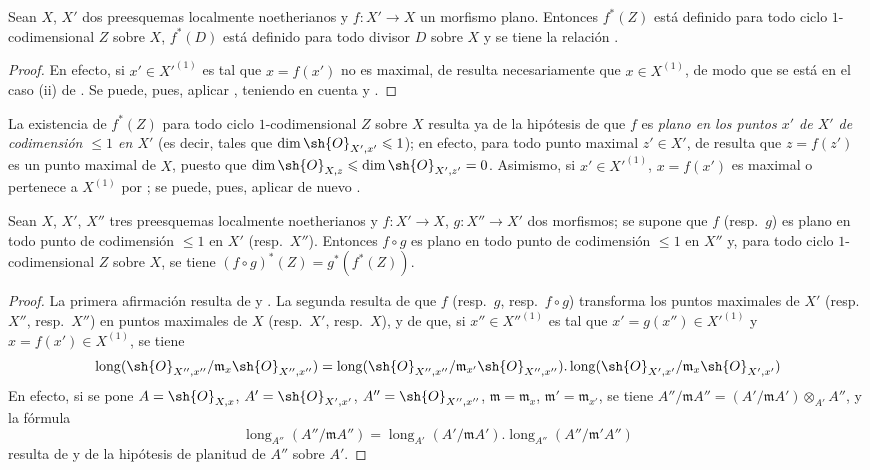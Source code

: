 \begin{proposition}[21.10.6]
\label{IV.21.10.6}
Sean $X$, $X'$ dos preesquemas localmente noetherianos y $f:X'\to X$ un morfismo plano.
Entonces $f^*(Z)$ está definido para todo ciclo $1$-codimensional $Z$ sobre $X$, $f^*(D)$ está definido para todo divisor $D$ sobre $X$ y se tiene la relación .
\end{proposition}

\begin{proof}
En efecto, si $x'\in X'^{(1)}$ es tal que $x=f(x')$ no es maximal, de  resulta necesariamente que $x\in X^{(1)}$, de modo que se está en el caso (ii) de .
Se puede, pues, aplicar , teniendo en cuenta  y .
\end{proof}

\begin{remark}[21.10.7]
\label{IV.21.10.7}
La existencia de $f^*(Z)$ para todo ciclo $1$-codimensional $Z$ sobre $X$ resulta ya de la hipótesis de que $f$ es \emph{plano en los puntos $x'$ de $X'$ de codimensión $\leq1$ en $X'$} (es decir, tales que $\dim\sh{O}_{X',x'}\leq1$);
en efecto, para todo punto maximal $z'\in X'$, de  resulta que $z=f(z')$ es un punto maximal de $X$, puesto que $\dim\sh{O}_{X,z}\leq\dim\sh{O}_{X',z'}=0$.
Asimismo, si $x'\in X'^{(1)}$, $x=f(x')$ es maximal o pertenece a $X^{(1)}$ por ;
se puede, pues, aplicar de nuevo .
\end{remark}

\begin{proposition}[21.10.8]
\label{IV.21.10.8}
Sean $X$, $X'$, $X''$ tres preesquemas localmente noetherianos y $f:X'\to X$, $g:X''\to X'$ dos morfismos;
se supone que $f$ \textup{(resp.\ $g$)} es plano en todo punto de codimensión $\leq1$ en $X'$ \textup{(resp.\ $X''$)}.
Entonces $f\circ g$ es plano en todo punto de codimensión $\leq1$ en $X''$ y, para todo ciclo $1$-codimensional $Z$ sobre $X$, se tiene $(f\circ g)^*(Z)=g^*(f^*(Z))$.
\end{proposition}

\begin{proof}
La primera afirmación resulta de  y .
La segunda resulta de que $f$ (resp.\ $g$, resp.\ $f\circ g$) transforma los puntos maximales de $X'$ (resp.\ $X''$, resp.\ $X''$) en puntos maximales de $X$ (resp.\ $X'$, resp.\ $X$), y de que, si $x''\in X''^{(1)}$ es tal que $x'=g(x'')\in X'^{(1)}$ y $x=f(x')\in X^{(1)}$, se tiene
\[
  \operatorname{long}(\sh{O}_{X'',x''}/\mathfrak{m}_x\sh{O}_{X'',x''})
  =\operatorname{long}(\sh{O}_{X'',x''}/\mathfrak{m}_{x'}\sh{O}_{X'',x''})
   .\operatorname{long}(\sh{O}_{X',x'}/\mathfrak{m}_x\sh{O}_{X',x'})
\]
En efecto, si se pone $A=\sh{O}_{X,x}$, $A'=\sh{O}_{X',x'}$, $A''=\sh{O}_{X'',x''}$, $\mathfrak{m}=\mathfrak{m}_x$, $\mathfrak{m}'=\mathfrak{m}_{x'}$, se tiene $A''/\mathfrak{m}A''=(A'/\mathfrak{m}A')\otimes_{A'}A''$, y la fórmula
\[
  \operatorname{long}_{A''}(A''/\mathfrak{m}A'')
  =\operatorname{long}_{A'}(A'/\mathfrak{m}A')
   .\operatorname{long}_{A''}(A''/\mathfrak{m}'A'')
\]
resulta de  y de la hipótesis de planitud de $A''$ sobre $A'$.
\end{proof}

